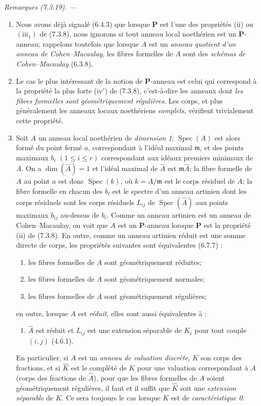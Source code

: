 \documentclass[10pt,oneside]{book}
\newenvironment{remarks}[1][]{%
  \par\medskip\noindent\itshape Remarques (#1). ---\ }{\par}
\begin{document}
\begin{remarks}[7.3.19]
\begin{enumerate}
\item[\emph{ii)}] Nous avons déjà signalé (6.4.3) que lorsque $\boldsymbol P$ est
l'une des propriétés (ii) ou $(\mathrm{iii}_1)$ de (7.3.8), nous ignorons
si tout anneau local noethérien est un $\boldsymbol P$-anneau; rappelons
toutefois que lorsque $A$ est un \emph{anneau quotient d'un anneau de
Cohen--Macaulay}, les fibres formelles de $A$ sont des \emph{schémas de
Cohen--Macaulay} (6.3.8).
\item[\emph{iii)}] Le cas le plus intéressant de la notion de $\boldsymbol P$-anneau
est celui qui correspond à la propriété la plus forte (iv$'$) de
(7.3.8), c'est-à-dire les anneaux dont \emph{les fibres formelles sont
géométriquement régulières}. Les corps, et plus généralement les anneaux
locaux noethériens \emph{complets}, vérifient trivialement cette
propriété.
\item[\emph{iv)}] Soit $A$ un anneau local noethérien de \emph{dimension 1};
$\operatorname{Spec}(A)$ est alors formé du point fermé $a$,
correspondant à l'idéal maximal $\mathfrak m$, et des points maximaux
$b_i$ $(1\leqslant i\leqslant r)$ correspondant aux idéaux premiers
minimaux de $A$. On a $\dim(\widehat A)=1$ et l'idéal maximal de
$\widehat A$ est $\mathfrak m\widehat A$; la fibre formelle de $A$ au
point $a$ est donc $\operatorname{Spec}(k)$, où $k=A/\mathfrak m$ est le
corps résiduel de $A$; la fibre formelle en chacun des $b_i$ est le
spectre d'un anneau artinien dont les corps résiduels sont les corps
résiduels $L_{ij}$ de $\operatorname{Spec}(\widehat A)$ aux points
maximaux $b_{ij}$ au-dessus de $b_i$. Comme un anneau artinien est un
anneau de Cohen--Macaulay, on voit que $A$ est un
$\boldsymbol P$-anneau lorsque $\boldsymbol P$ est la propriété (ii) de
(7.3.8). En outre, comme un anneau artinien réduit est une somme directe
de corps, les propriétés suivantes sont équivalentes (6.7.7) :
\begin{enumerate}
\item[\emph{a)}] les fibres formelles de $A$ sont géométriquement réduites;
\item[\emph{b)}] les fibres formelles de $A$ sont géométriquement normales;
\item[\emph{c)}] les fibres formelles de $A$ sont géométriquement régulières;
\end{enumerate}
en outre, lorsque $A$ est \emph{réduit}, elles sont aussi équivalentes à :
\begin{enumerate}
\item[\emph{d)}] $\widehat A$ est réduit et $L_{ij}$ est une extension séparable de
$K_i$ pour tout couple $(i,j)$ (4.6.1).
\end{enumerate}
En particulier, si $A$ est un \emph{anneau de valuation discrète}, $K$
son corps des fractions, et si $\widehat K$ est le complété de $K$ pour
une valuation correspondant à $A$ (corps des fractions de $\widehat A$),
pour que les fibres formelles de $A$ soient géométriquement régulières,
il faut et il suffit que $\widehat K$ soit une \emph{extension séparable}
de $K$. Ce sera toujours le cas lorsque $K$ est de \emph{caractéristique
0}.
\end{enumerate}
\end{remarks}
\end{document}
